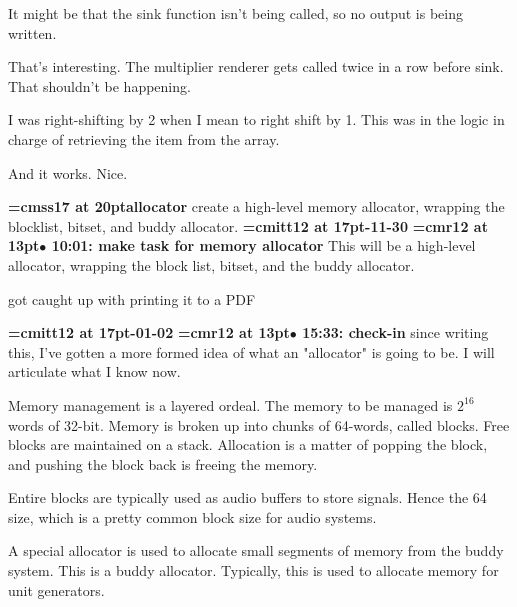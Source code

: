 It might be that the sink function isn't being called, so no output is being written.
\par

That's interesting. The multiplier renderer gets called twice in a row before sink. That shouldn't be happening.
\par

I was right-shifting by 2 when I mean to right shift by 1. This was in the logic in charge of retrieving the item from the array.
\par

And it works. Nice.
\par

{\medskip\noindent\bf\font\titlefont=cmss17 at 20pt\titlefont allocator}\medskip
create a high-level memory allocator,
wrapping the blocklist, bitset, and buddy
allocator.
{\medskip\noindent\bf\font\titlefont=cmitt12 at 17pt-11-30}\medskip
{\smallskip\noindent\bf\font\titlefont=cmr12 at 13pt\titlefont $\bullet$ 10:01: make task for memory allocator}\smallskip
This will be a high-level allocator, wrapping the block list, bitset, and the buddy allocator.
\par

got caught up with printing it to a PDF
\par

{\medskip\noindent\bf\font\titlefont=cmitt12 at 17pt-01-02}\medskip
{\smallskip\noindent\bf\font\titlefont=cmr12 at 13pt\titlefont $\bullet$ 15:33: check-in}\smallskip
since writing this, I've gotten a more formed idea of what an "allocator" is going to be. I will articulate what I know now.
\par

Memory management is a layered ordeal. The memory to be managed is $2^{16}$ words of 32-bit. Memory is broken up into chunks of 64-words, called blocks. Free blocks are maintained on a stack. Allocation is a matter of popping the block, and pushing the block back is freeing the memory.
\par

Entire blocks are typically used as audio buffers to store signals. Hence the 64 size, which is a pretty common block size for audio systems.
\par

A special allocator is used to allocate small segments of memory from the buddy system. This is a buddy allocator. Typically, this is used to allocate memory for unit generators.
\par


